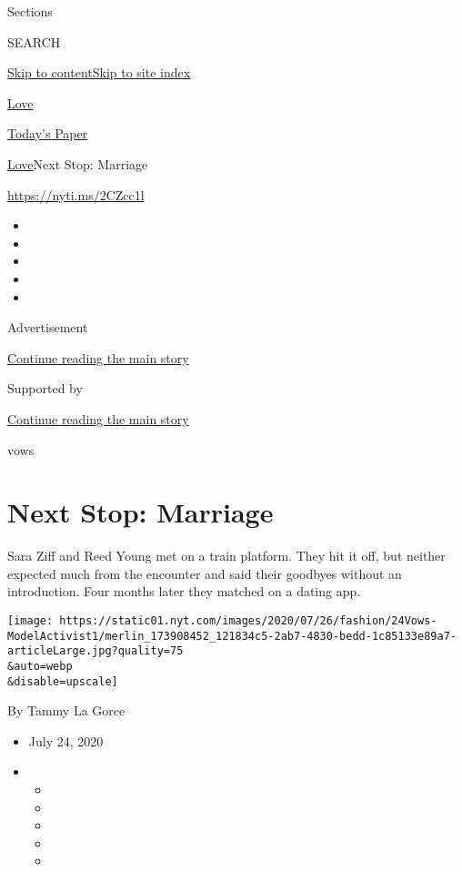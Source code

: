 Sections

SEARCH

\protect\hyperlink{site-content}{Skip to
content}\protect\hyperlink{site-index}{Skip to site index}

\href{https://www.nytimes.com/section/fashion/weddings}{Love}

\href{https://myaccount.nytimes.com/auth/login?response_type=cookie\&client_id=vi}{}

\href{https://www.nytimes.com/section/todayspaper}{Today's Paper}

\href{/section/fashion/weddings}{Love}\textbar{}Next Stop: Marriage

\url{https://nyti.ms/2CZcc1l}

\begin{itemize}
\item
\item
\item
\item
\item
\end{itemize}

Advertisement

\protect\hyperlink{after-top}{Continue reading the main story}

Supported by

\protect\hyperlink{after-sponsor}{Continue reading the main story}

vows

\hypertarget{next-stop-marriage}{%
\section{Next Stop: Marriage}\label{next-stop-marriage}}

Sara Ziff and Reed Young met on a train platform. They hit it off, but
neither expected much from the encounter and said their goodbyes without
an introduction. Four months later they matched on a dating app.

\texttt{[image: https://static01.nyt.com/images/2020/07/26/fashion/24Vows-ModelActivist1/merlin\_173908452\_121834c5-2ab7-4830-bedd-1c85133e89a7-articleLarge.jpg?quality=75\\\&auto=webp\\\&disable=upscale]}

By Tammy La Gorce

\begin{itemize}
\item
  July 24, 2020
\item
  \begin{itemize}
  \item
  \item
  \item
  \item
  \item
  \end{itemize}
\end{itemize}

